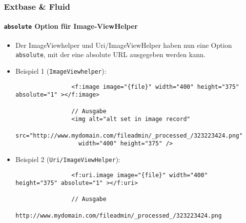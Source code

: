 \begin{frame}[fragile]
	\frametitle{Extbase \& Fluid}
	\framesubtitle{\texttt{absolute} Option für Image-ViewHelper}

	\lstset{basicstyle=\tiny\ttfamily}

	\begin{itemize}

		\item Der ImageViewhelper und Uri/ImageViewHelper haben nun eine Option \texttt{absolute},
			mit der eine absolute URL ausgegeben werden kann.

		\item Beispiel 1 (\texttt{ImageViewhelper}):

			\begin{lstlisting}
				<f:image image="{file}" width="400" height="375" absolute="1" ></f:image>

				// Ausgabe
				<img alt="alt set in image record"
				  src="http://www.mydomain.com/fileadmin/_processed_/323223424.png"
				  width="400" height="375" />
			\end{lstlisting}

		\item Beispiel 2 (\texttt{Uri/ImageViewHelper}):

			\begin{lstlisting}
				<f:uri.image image="{file}" width="400" height="375" absolute="1" ></f:uri>

				// Ausgabe
				http://www.mydomain.com/fileadmin/_processed_/323223424.png
			\end{lstlisting}

	\end{itemize}

\end{frame}


